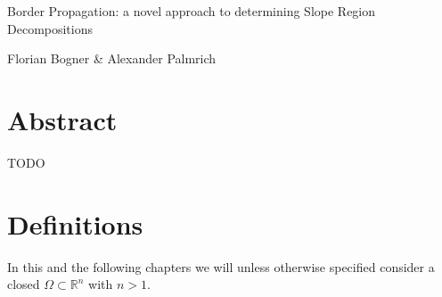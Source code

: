 \documentclass[a4paper,12pt]{paper}
\begin{document}
\begin{titlepage}
\huge
\centering
Border Propagation: a novel approach to determining Slope Region Decompositions

\vfill

\normalsize
Florian Bogner \& Alexander Palmrich
\end{titlepage}




\tableofcontents
\newpage

\section{Abstract}

TODO

\section{Definitions}

In this and the following chapters we will unless otherwise specified consider a closed $\Omega \subset \mathbb{R}^n$ with $n > 1$.
\end{document}
